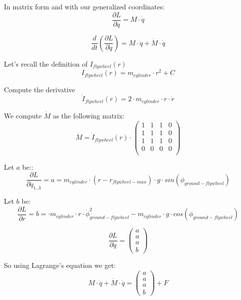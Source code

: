 In matrix form and with our generalized coordinates:
\begin{equation}
	\frac{\partial L}{\partial \dot{q}} =
	M \cdot \dot{q}
\end{equation}

\begin{equation}
	\frac{d}{dt}(\frac{\partial L}{\partial \dot{q}}) =
	 	M \cdot \ddot{q} + \dot{M} \cdot \dot{q} 	
\end{equation}

Let's recall the definition of $I_{flywheel}(r)$
\begin{equation}
	I_{flywheel}(r)= m_{cylinder} \cdot r^2 + C	
\end{equation}


Compute the derivative
\begin{equation}
	\dot{I}_{flywheel}(r)= 2 \cdot m_{cylinder} \cdot r \cdot \dot{r} 	
\end{equation}

We compute $\dot{M}$ as the following matrix:
\begin{equation}
	\dot{M}=
	\dot{I}_{flywheel}(r) \cdot
	\begin{pmatrix} 
		1&
		1&
		1&
		0\\
		1 &
		1 &
		1&
		0\\
		1 &
		1 &
		1 &
		0\\
		0 &
		0 &
		0 &
		0\\
		\end{pmatrix}
\end{equation}

Let $a$ be::
\begin{equation}
	\frac{\partial L}{\partial q_{1..3}} = a = m_{cylinder}\cdot (r-r_{flywheel-max}) \cdot g \cdot sin(\phi_{ground-flywheel})	
\end{equation}

Let $b$ be:
\begin{equation}
	\frac{\partial L}{\partial r} = b = \cdot m_{cylinder} \cdot r  \cdot \dot{\phi}_{ground-flywheel}^2  - m_{cylinder}\cdot g \cdot cos(\phi_{ground-flywheel})	
\end{equation}

\begin{equation}
	\frac{\partial L}{\partial q} = \begin{pmatrix}
	a \\ a \\ a \\ b
	\end{pmatrix}	
\end{equation}

So using Lagrange's equation we get:
\begin{equation}
	\boxed{
	M \cdot \ddot{q} + \dot{M} \cdot \dot{q}= 
	\begin{pmatrix}
		a \\ a \\ a \\ b
		\end{pmatrix}	
 	+ F
	}
\end{equation}